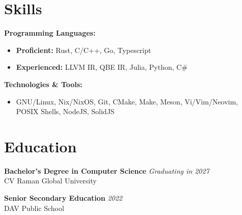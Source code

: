 \documentclass[a4paper,11pt]{article}
\begin{document}
\vspace{-0.5em}
\section*{Skills}
\textbf{Programming Languages:}
\begin{itemize}[noitemsep, topsep=0pt]
    \item \textbf{Proficient:} Rust, C/C++, Go, Typescript
    \item \textbf{Experienced:} LLVM IR, QBE IR, Julia, Python, C\# \vspace{0.5em}
\end{itemize}

\noindent\textbf{Technologies \& Tools:}
\begin{itemize}[noitemsep, topsep=0pt]
    \item GNU/Linux, Nix/NixOS, Git, CMake, Make, Meson, Vi/Vim/Neovim, POSIX Shells, NodeJS, SolidJS
\end{itemize}

\section*{Education}
\noindent\textbf{Bachelor's Degree in Computer Science} \hfill \textit{Graduating in 2027}\\
\noindent CV Raman Global University \vspace{0.5em}

\noindent\textbf{Senior Secondary Education} \hfill \textit{2022}\\
\noindent DAV Public School
\end{document}
